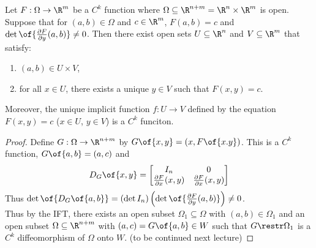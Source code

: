 \begin{theorem}
    Let $F: \Omega \to \R^m$ be a $C^k$ function where $\Omega \subseteq \R^{n + m} = \R^n \times \R^m$ is open. Suppose that for $(a,b) \in \Omega$ and $c \in \R^m$, $F(a,b) = c$ and $\det \of{\frac{\partial F}{\partial y}(a,b)} \neq 0$. Then there exist open sets $U \subseteq \R^n$ and $V \subseteq \R^m$ that satisfy:
    \begin{enumerate}
        \item $(a,b) \in U \times V$,
        \item for all $x \in U$, there exists a unique $y \in V$ such that $F(x,y) = c$.
    \end{enumerate}
    Moreover, the unique implicit function $f: U \to V$ defined by the equation $F(x,y) = c$ ($x \in U$, $y \in V$) is a $C^k$ funciton.
\end{theorem}
\begin{proof}
    Define $G: \Omega \to \R^{n + m}$ by $G\of{x,y} = (x, F\of{x.y})$. This is a $C^k$ function, $G\of{a,b} = (a, c)$ and
    $$D_G\of{x,y} = \begin{bmatrix}
        I_n & 0 \\
        \frac{\partial F}{\partial x}(x,y) & \frac{\partial F}{\partial x}(x,y)
    \end{bmatrix}$$
    Thus $\det\of{D_G\of{a,b}} = \left(\det I_n\right)\left(\det\of{\frac{\partial F}{\partial y}(a,b)}\right) \neq 0$. \\
    Thus by the IFT, there exists an open subset $\Omega_1 \subseteq \Omega$ with $(a,b) \in \Omega_1$ and an open subset $\Omega \subseteq \R^{n + m}$ with $(a,c) = G\of{a,b} \in W$ such that $G \restr \Omega_1$ is a $C^k$ diffeomorphism of $\Omega$ onto $W$.
    (to be continued next lecture)
\end{proof}